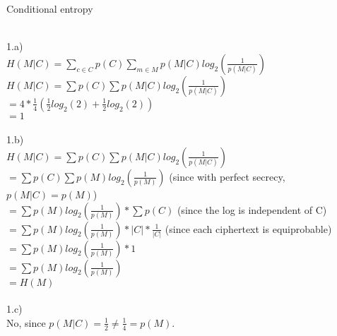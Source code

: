 \documentclass{assignment}
\begin{document}
\begin{problemlist}
\pbitem Conditional entropy
\begin{problem}
\begin{answer}
\\
1.a)\\
$H(M|C)=\sum_{c\in C}p(C)\sum_{m\in M}p(M|C)log_2(\frac{1}{p(M|C)})$\\
$H(M|C)=\sum p(C)\sum p(M|C)log_2(\frac{1}{p(M|C)})$\\
$=4*\frac{1}{4}(\frac{1}{2}log_2(2)+ \frac{1}{2}log_2(2))$\\
$=1$\\
\\
1.b)\\
$H(M|C)=\sum p(C)\sum p(M|C)log_2(\frac{1}{p(M|C)})$\\
$=\sum p(C)\sum p(M)log_2(\frac{1}{p(M)})$ (since with perfect secrecy, $p(M|C)=p(M)$)\\
$=\sum p(M)log_2(\frac{1}{p(M)}) * \sum p(C)$  (since the log is independent of C)\\
$=\sum p(M)log_2(\frac{1}{p(M)}) * |C|*\frac{1}{|C|}$  (since each ciphertext is equiprobable)\\ 
$=\sum p(M)log_2(\frac{1}{p(M)}) * 1$ \\
$=\sum p(M)log_2(\frac{1}{p(M)})$ \\
$=H(M)$\\
\\
1.c)\\
No, since $p(M|C)=\frac{1}{2}\neq\frac{1}{4}=p(M)$.\\
\\
\end{answer}
\end{problem}


\end{problemlist}
\end{document}

